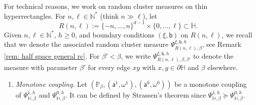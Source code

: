\documentclass[11pt,a4paper]{article}
\numberwithin{equation}{section}
\theoremstyle{plain}
\theoremstyle{definition}
\begin{document}
For technical reasons, we work on random cluster measures on thin hyperrectangles. For $n,\ell \in \mathbb N^*$ (think $n\gg \ell$), let 
$$R(n,\ell):= \{-n,\dots,n\}^{d-1}\times \{0,\dots, \ell\} \subset \mathbb H.$$ 
Given $n,\ell \in \mathbb N^*$, $h \geq 0$, and boundary conditions $(\xi, \mathsf b)$ on $R(n,\ell)$, we recall that we denote the associated random cluster measure $\Psi^{\xi,\mathsf b, h}_{R(n,\ell),\beta}$, see Remark \ref{rem: half space general rc}. For $\beta'<\beta$, we write $\Psi^{\xi,\mathsf b, h}_{R(n,\ell),\beta,\beta'}$ to denote the measure with parameter $\beta'$ for every edge $xy$ with $x,y \in \partial \mathbb H$ and $\beta$ elsewhere. 
\begin{enumerate}
    \item[$\bullet$] \textit{Monotone coupling.} Let $(\mathbb P_{\beta}, (\mathsf a^1, \omega^1), (\mathsf a^0, \omega^0))$ be a monotone coupling of $\Psi^{1,h}_{\mathbb H, \beta}$ and $\Psi^{0,h}_{\mathbb H, \beta}$. It can be defined by Strassen's theorem since $\Psi^{1,h}_{\mathbb H, \beta} \succcurlyeq \Psi^{0,h}_{\mathbb H, \beta}$.
    

\end{enumerate}
\end{document}
